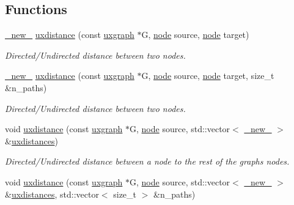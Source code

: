 \subsection*{Functions}
\begin{DoxyCompactItemize}
\item 
\hyperlink{namespacelgraph_aa930092705699c3af78e3a4de7880a3f}{\+\_\+new\+\_\+} \hyperlink{namespacelgraph_1_1traversal_a73bb6b5984fc97e12576ca4f16344fbf}{uxdistance} (const \hyperlink{classlgraph_1_1uxgraph}{uxgraph} $\ast$G, \hyperlink{namespacelgraph_a397169dd66adf725210a30fb7251773e}{node} source, \hyperlink{namespacelgraph_a397169dd66adf725210a30fb7251773e}{node} target)
\begin{DoxyCompactList}\small\item\em Directed/\+Undirected distance between two nodes. \end{DoxyCompactList}\item 
\hyperlink{namespacelgraph_aa930092705699c3af78e3a4de7880a3f}{\+\_\+new\+\_\+} \hyperlink{namespacelgraph_1_1traversal_a084aa7ff13d10613c411ff8d4a2dc4c8}{uxdistance} (const \hyperlink{classlgraph_1_1uxgraph}{uxgraph} $\ast$G, \hyperlink{namespacelgraph_a397169dd66adf725210a30fb7251773e}{node} source, \hyperlink{namespacelgraph_a397169dd66adf725210a30fb7251773e}{node} target, size\+\_\+t \&n\+\_\+paths)
\begin{DoxyCompactList}\small\item\em Directed/\+Undirected distance between two nodes. \end{DoxyCompactList}\item 
void \hyperlink{namespacelgraph_1_1traversal_a43974cb7096893f50511d745c8993cf0}{uxdistance} (const \hyperlink{classlgraph_1_1uxgraph}{uxgraph} $\ast$G, \hyperlink{namespacelgraph_a397169dd66adf725210a30fb7251773e}{node} source, std\+::vector$<$ \hyperlink{namespacelgraph_aa930092705699c3af78e3a4de7880a3f}{\+\_\+new\+\_\+} $>$ \&\hyperlink{namespacelgraph_1_1traversal_a401cf82c5e153e82a73f4be9d5d75288}{uxdistances})
\begin{DoxyCompactList}\small\item\em Directed/\+Undirected distance between a node to the rest of the graph\textquotesingle{}s nodes. \end{DoxyCompactList}\item 
void \hyperlink{namespacelgraph_1_1traversal_a1b00d5986cab46bf5cfaad0259886a72}{uxdistance} (const \hyperlink{classlgraph_1_1uxgraph}{uxgraph} $\ast$G, \hyperlink{namespacelgraph_a397169dd66adf725210a30fb7251773e}{node} source, std\+::vector$<$ \hyperlink{namespacelgraph_aa930092705699c3af78e3a4de7880a3f}{\+\_\+new\+\_\+} $>$ \&\hyperlink{namespacelgraph_1_1traversal_a401cf82c5e153e82a73f4be9d5d75288}{uxdistances}, std\+::vector$<$ size\+\_\+t $>$ \&n\+\_\+paths)

\end{DoxyCompactItemize}
